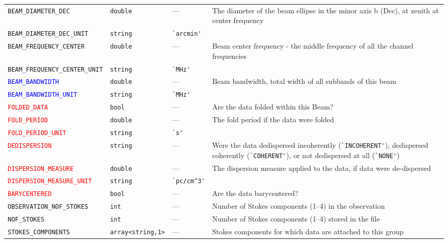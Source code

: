 \documentclass[a4paper,10pt,bibtotoc]{scrartcl}
\begin{document}
\begin{supertabular}{|lllp{5.5cm}|}
  \small{\verb|BEAM_DIAMETER_DEC|}  & \verb|double| & --- & The diameter of the beam ellipse in the minor axis b (Dec), at zenith at center frequency \\
  \small{\verb|BEAM_DIAMETER_DEC_UNIT|}  & \verb|string| & \verb|`arcmin'| & \\
  \small{\verb|BEAM_FREQUENCY_CENTER|}  & \verb|double| & --- & Beam center frequency - the middle frequency of all the channel frequencies \\
  \small{\verb|BEAM_FREQUENCY_CENTER_UNIT|}  & \verb|string| & \verb|`MHz'| & \\
  \small{\textcolor{blue}{\texttt{BEAM\_BANDWIDTH}}}  & \verb|double| & --- & Beam bandwidth, total width of all subbands of this beam \\
  \small{\textcolor{blue}{\texttt{BEAM\_BANDWIDTH\_UNIT}}}  & \verb|string| & \verb|`MHz'| &  \\
  \small{\textcolor{red}{\texttt{FOLDED\_DATA}}}  & \verb|bool| & --- & Are the data folded within this Beam? \\
  \small{\textcolor{red}{\texttt{FOLD\_PERIOD}}}     & \verb|double| & --- & The fold period if the data were folded \\
  \small{\textcolor{red}{\texttt{FOLD\_PERIOD\_UNIT}}}     & \verb|string| & \verb|`s'| & \\
  \small{\textcolor{red}{\texttt{DEDISPERSION}}}     & \verb|string| & --- & Were the data dedispersed incoherently (\verb|`INCOHERENT'|), dedispersed coherently (\verb|`COHERENT'|), or not dedispersed at all (\verb|`NONE'|) \\
  \small{\textcolor{red}{\texttt{DISPERSION\_MEASURE}}}     & \verb|double| & --- & The dispersion  measure applied to the data, if data were de-dispersed \\
  \small{\textcolor{red}{\texttt{DISPERSION\_MEASURE\_UNIT}}}     & \verb|string| & \verb|`pc/cm^3'| & \\
  \small{\textcolor{red}{\texttt{BARYCENTERED}}}   & \verb|bool| & --- & Are the data barycentered? \\
  \small{\verb|OBSERVATION_NOF_STOKES|}   & \verb|int|     & --- & Number of Stokes components (1--4) in the observation \\
  \small{\verb|NOF_STOKES|}   & \verb|int|     & --- & Number of Stokes components (1--4) stored in the file \\
  \small{\verb|STOKES_COMPONENTS|} & \verb|array<string,1>| & --- & Stokes components for which data are attached to this group \\

\end{supertabular}
\end{document}

